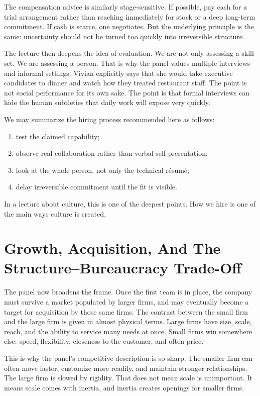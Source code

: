 The compensation advice is similarly stage-sensitive. If possible, pay cash for a trial arrangement rather than reaching immediately for stock or a deep long-term commitment. If cash is scarce, one negotiates. But the underlying principle is the same: uncertainty should not be turned too quickly into irreversible structure.

The lecture then deepens the idea of evaluation. We are not only assessing a skill set. We are assessing a person. That is why the panel values multiple interviews and informal settings. Vivian explicitly says that she would take executive candidates to dinner and watch how they treated restaurant staff. The point is not social performance for its own sake. The point is that formal interviews can hide the human subtleties that daily work will expose very quickly.

We may summarize the hiring process recommended here as follows:

\begin{enumerate}
\item test the claimed capability;
\item observe real collaboration rather than verbal self-presentation;
\item look at the whole person, not only the technical résumé;
\item delay irreversible commitment until the fit is visible.
\end{enumerate}

In a lecture about culture, this is one of the deepest points. How we hire is one of the main ways culture is created.

\section{Growth, Acquisition, And The Structure--Bureaucracy Trade-Off}

The panel now broadens the frame. Once the first team is in place, the company must survive a market populated by larger firms, and may eventually become a target for acquisition by those same firms. The contrast between the small firm and the large firm is given in almost physical terms. Large firms have size, scale, reach, and the ability to service many needs at once. Small firms win somewhere else: speed, flexibility, closeness to the customer, and often price.

This is why the panel's competitive description is so sharp. The smaller firm can often move faster, customize more readily, and maintain stronger relationships. The large firm is slowed by rigidity. That does not mean scale is unimportant. It means scale comes with inertia, and inertia creates openings for smaller firms.

